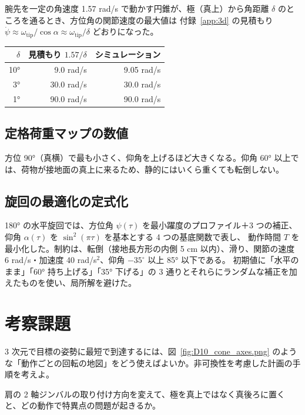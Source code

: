 腕先を一定の角速度 1.57 rad/s で動かす円錐が、極（真上）から角距離 $\delta$ のところを通るとき、方位角の関節速度の最大値は
付録~\ref{app:3d} の見積もり $\dot\psi\approx\omega_{\text{tip}}/\cos\alpha\approx\omega_{\text{tip}}/\delta$ どおりになった。
\begin{longtable}{rrr}
\toprule
$\delta$ & 見積もり $1.57/\delta$ & シミュレーション \\ \midrule \endhead
10° & 9.0 rad/s & 9.05 rad/s \\
3° & 30.0 rad/s & 30.0 rad/s \\
1° & 90.0 rad/s & 90.0 rad/s \\
\bottomrule
\end{longtable}

\subsection{定格荷重マップの数値}


方位 90°（真横）で最も小さく、仰角を上げるほど大きくなる。仰角 60° 以上では、荷物が接地面の真上に来るため、静的にはいくら重くても転倒しない。

\subsection{旋回の最適化の定式化}

180° の水平旋回では、方位角 $\psi(\tau)$ を最小躍度のプロファイル＋3 つの補正、仰角 $\alpha(\tau)$ を $\sin^2(\pi\tau)$ を基本とする 4 つの基底関数で表し、
動作時間 $T$ を最小化した。制約は、転倒（接地長方形の内側 5 cm 以内）、滑り、関節の速度 6 rad/s・加速度 40 rad/s$^2$、仰角 $-35^\circ$ 以上 85° 以下である。
初期値に「水平のまま」「60° 持ち上げる」「35° 下げる」の 3 通りとそれらにランダムな補正を加えたものを使い、局所解を避けた。

\section*{考察課題}
\begin{exercise}
3 次元で目標の姿勢に最短で到達するには、図~\ref{fig:D10_cone_axes.png} のような「動作ごとの回転の地図」をどう使えばよいか。非可換性を考慮した計画の手順を考えよ。
\end{exercise}
\begin{exercise}
肩の 2 軸ジンバルの取り付け方向を変えて、極を真上ではなく真後ろに置くと、どの動作で特異点の問題が起きるか。
\end{exercise}
